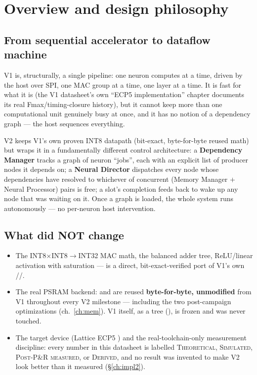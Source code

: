 \chapter{Overview and design philosophy}
\label{ch:overview}

\section{From sequential accelerator to dataflow machine}
V1 is, structurally, a single pipeline: one neuron computes at a time,
driven by the host over SPI, one MAC group at a time, one layer at a
time. It is fast for what it is (the V1 datasheet's own ``ECP5
implementation'' chapter documents its real Fmax/timing-closure history),
but it cannot keep
more than one computational unit genuinely busy at once, and it has no
notion of a dependency graph --- the host sequences everything.

V2 keeps V1's own proven INT8 datapath (bit-exact, byte-for-byte reused
math) but wraps it in a fundamentally different control architecture:
a \textbf{Dependency Manager} tracks a graph of neuron ``jobs'', each
with an explicit list of producer nodes it depends on; a \textbf{Neural
Director} dispatches every node whose dependencies have resolved to
whichever of  concurrent (Memory Manager $+$ Neural
Processor) pairs is free; a slot's completion feeds back to wake up any
node that was waiting on it. Once a graph is loaded, the whole system
runs autonomously --- no per-neuron host intervention.

\section{What did NOT change}
\begin{itemize}
\item The INT8$\times$INT8$\to$INT32 MAC math, the balanced adder tree,
      ReLU/linear activation with saturation --- 
      is a direct, bit-exact-verified port of V1's own
      //.
\item The real PSRAM backend:  and
       are reused \textbf{byte-for-byte,
      unmodified} from V1 throughout every V2 milestone --- including
      the two post-campaign optimizations (ch.~\ref{ch:mem}). V1 itself,
      as a tree (), is frozen and was never touched.
\item The target device (Lattice ECP5 ) and the
      real-toolchain-only measurement discipline: every number in this
      datasheet is labelled \textsc{Theoretical}, \textsc{Simulated},
      \textsc{Post-P\&R measured}, or \textsc{Derived}, and no result was
      invented to make V2 look better than it measured (§\ref{ch:impl2}).
\end{itemize}

